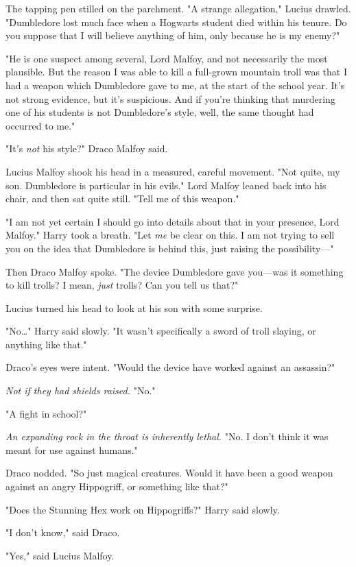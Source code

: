 The tapping pen stilled on the parchment. "A strange allegation," Lucius
drawled. "Dumbledore lost much face when a Hogwarts student died within his
tenure. Do you suppose that I will believe anything of him, only because he is
my enemy?"

"He is one suspect among several, Lord Malfoy, and not necessarily the most
plausible. But the reason I was able to kill a full-grown mountain troll was
that I had a weapon which Dumbledore gave to me, at the start of the school
year. It's not strong evidence, but it's suspicious. And if you're thinking
that murdering one of his students is not Dumbledore's style, well, the same
thought had occurred to me."

"It's \emph{not} his style?" Draco Malfoy said.

Lucius Malfoy shook his head in a measured, careful movement. "Not quite, my
son. Dumbledore is particular in his evils." Lord Malfoy leaned back into his
chair, and then sat quite still. "Tell me of this weapon."

"I am not yet certain I should go into details about that in your presence,
Lord Malfoy." Harry took a breath. "Let \emph{me} be clear on this. I am not
trying to sell you on the idea that Dumbledore is behind this, just raising the
possibility---"

Then Draco Malfoy spoke. "The device Dumbledore gave you---was it something to
kill trolls? I mean, \emph{just} trolls? Can you tell us that?"

Lucius turned his head to look at his son with some surprise.

"No{\ldots}" Harry said slowly. "It wasn't specifically a sword of troll
slaying, or anything like that."

Draco's eyes were intent. "Would the device have worked against an assassin?"

\emph{Not if they had shields raised.} "No."

"A fight in school?"

\emph{An expanding rock in the throat is inherently lethal.} "No. I don't think
it was meant for use against humans."

Draco nodded. "So just magical creatures. Would it have been a good weapon
against an angry Hippogriff, or something like that?"

"Does the Stunning Hex work on Hippogriffs?" Harry said slowly.

"I don't know," said Draco.

"Yes," said Lucius Malfoy.

